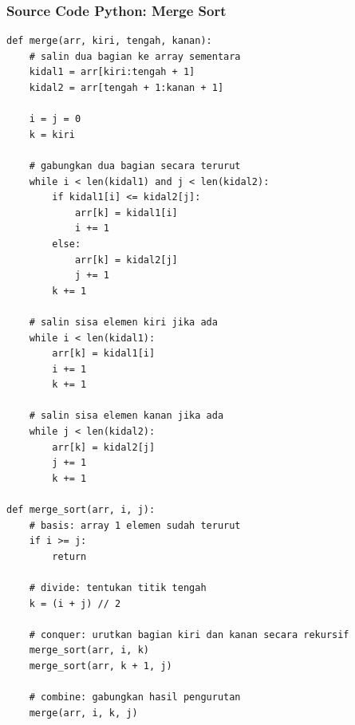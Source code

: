\subsubsection*{Source Code Python: Merge Sort}
\begin{lstlisting}[basicstyle=\ttfamily\scriptsize, frame=single, backgroundcolor=\color{white}, numbers=none, keywordstyle=\color{black}, commentstyle=\color{black}, stringstyle=\color{black}, breaklines=true]
def merge(arr, kiri, tengah, kanan):
    # salin dua bagian ke array sementara
    kidal1 = arr[kiri:tengah + 1]
    kidal2 = arr[tengah + 1:kanan + 1]
    
    i = j = 0
    k = kiri
    
    # gabungkan dua bagian secara terurut
    while i < len(kidal1) and j < len(kidal2):
        if kidal1[i] <= kidal2[j]:
            arr[k] = kidal1[i]
            i += 1
        else:
            arr[k] = kidal2[j]
            j += 1
        k += 1
        
    # salin sisa elemen kiri jika ada
    while i < len(kidal1):
        arr[k] = kidal1[i]
        i += 1
        k += 1
        
    # salin sisa elemen kanan jika ada
    while j < len(kidal2):
        arr[k] = kidal2[j]
        j += 1
        k += 1

def merge_sort(arr, i, j):
    # basis: array 1 elemen sudah terurut
    if i >= j:
        return
        
    # divide: tentukan titik tengah
    k = (i + j) // 2
    
    # conquer: urutkan bagian kiri dan kanan secara rekursif
    merge_sort(arr, i, k)
    merge_sort(arr, k + 1, j)
    
    # combine: gabungkan hasil pengurutan
    merge(arr, i, k, j)
\end{lstlisting}

